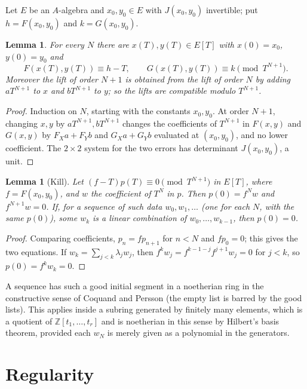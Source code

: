 \documentclass[11pt]{amsart}
\newtheorem{lemma}[theorem]{Lemma}
\theoremstyle{definition}
\theoremstyle{remark}
\begin{document}
Let $E$ be an $A$-algebra and $x_0,y_0\in E$ with $J(x_0,y_0)$
invertible; put $h=F(x_0,y_0)$ and $k=G(x_0,y_0)$.

\begin{lemma}\label{lem:lift}
For every $N$ there are $x(T),y(T)\in E[T]$ with $x(0)=x_0$, $y(0)=y_0$ and
\[
 F(x(T),y(T))\equiv h-T,\qquad G(x(T),y(T))\equiv k\pmod{T^{N+1}}.
\]
Moreover the lift of order $N+1$ is obtained from the lift of order $N$
by adding $aT^{N+1}$ to $x$ and $bT^{N+1}$ to $y$; so the lifts are
compatible modulo $T^{N+1}$.
\end{lemma}

\begin{proof}
Induction on $N$, starting with the constants $x_0,y_0$. At order $N+1$,
changing $x,y$ by $aT^{N+1},bT^{N+1}$ changes the coefficients of
$T^{N+1}$ in $F(x,y)$ and $G(x,y)$ by $F_Xa+F_Yb$ and $G_Xa+G_Yb$ evaluated
at $(x_0,y_0)$, and no lower coefficient. The $2\times2$ system for the two
errors has determinant $J(x_0,y_0)$, a unit.
\end{proof}

\begin{lemma}[Kill]\label{lem:kill}
Let $(f-T)p(T)\equiv0\pmod{T^{N+1}}$ in $E[T]$, where $f=F(x_0,y_0)$, and
$w$ the coefficient of $T^N$ in $p$. Then $p(0)=f^Nw$ and $f^{N+1}w=0$.
If, for a sequence of such data $w_0,w_1,\dots$ (one for each $N$, with
the same $p(0)$), some $w_k$ is a linear combination of
$w_0,\dots,w_{k-1}$, then $p(0)=0$.
\end{lemma}

\begin{proof}
Comparing coefficients, $p_n=fp_{n+1}$ for $n<N$ and $fp_0=0$; this gives
the two equations. If $w_k=\sum_{j<k}\lambda_jw_j$, then
$f^kw_j=f^{k-1-j}f^{j+1}w_j=0$ for $j<k$, so $p(0)=f^kw_k=0$.
\end{proof}

A sequence has such a good initial segment in a noetherian ring in the
constructive sense of Coquand and Persson (the empty list is barred by
the good lists). This applies inside a subring generated by finitely many
elements, which is a quotient of $\mathbb Z[t_1,\dots,t_r]$ and is
noetherian in this sense by Hilbert's basis theorem, provided each $w_N$
is merely given as a polynomial in the generators.

\section{Regularity}
\end{document}
